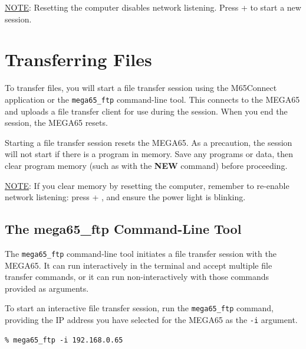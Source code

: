 \underline{NOTE}: Resetting the computer disables network listening. Press  + \megakey{\pounds} to start a new session.

\section{Transferring Files}

To transfer files, you will start a file transfer session using the M65Connect application or the {\tt mega65\_ftp} command-line tool. This connects to the MEGA65 and uploads a file transfer client for use during the session. When you end the session, the MEGA65 resets.

Starting a file transfer session resets the MEGA65. As a precaution, the session will not start if there is a program in memory. Save any programs or data, then clear program memory (such as with the {\bf NEW} command) before proceeding.

\underline{NOTE}: If you clear memory by resetting the computer, remember to re-enable network listening: press  + \megakey{\pounds}, and ensure the power light is blinking.


\subsection{The mega65\_ftp Command-Line Tool}

The {\tt mega65\_ftp} command-line tool initiates a file transfer session with the MEGA65. It can run interactively in the terminal and accept multiple file transfer commands, or it can run non-interactively with those commands provided as arguments.


To start an interactive file transfer session, run the {\tt mega65\_ftp} command, providing the IP address you have selected for the MEGA65 as the {\tt -i} argument.

\begin{verbatim}
% mega65_ftp -i 192.168.0.65
\end{verbatim}

